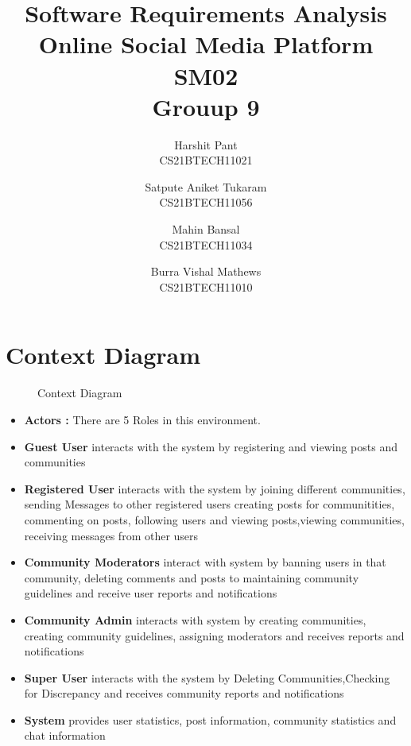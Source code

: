 \documentclass[11pt]{article}
\title{Software Requirements Analysis\\ Online Social Media Platform\\ SM02\\Grouup 9}
\author{Harshit Pant \\ CS21BTECH11021 \and Satpute Aniket Tukaram \\ CS21BTECH11056 \and Mahin Bansal \\ CS21BTECH11034 \and Burra Vishal Mathews \\ CS21BTECH11010}
\date{}
\begin{document}
\maketitle
\begin{center}
    \tableofcontents
\end{center}
\section{Context Diagram}

\begin{figure}[H]
    \centering
    \caption{Context Diagram}
    \label{fig:context_diagram}
\end{figure}

\begin{itemize}
    \item \textbf{Actors : } There are 5 Roles in this environment.
    \item \textbf{Guest User }interacts with the system by registering and viewing posts and communities
    \item \textbf{Registered User }interacts with the system by joining different communities, sending Messages to other registered users creating posts for communitities, commenting on posts, following users
          and viewing posts,viewing communities, receiving messages from other users
    \item \textbf{Community Moderators }interact with system by banning users in that community, deleting comments and posts to maintaining community guidelines and receive user reports and notifications
    \item \textbf{Community Admin }interacts with system by creating communities, creating community guidelines, assigning moderators and receives reports and notifications
    \item \textbf{Super User} interacts with the system by Deleting Communities,Checking for Discrepancy and receives community reports and notifications
    \item \textbf{System }provides user statistics, post information, community statistics and chat information
\end{itemize}
\end{document}
